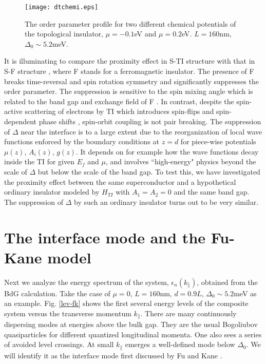 \documentclass[11pt]{report}
\begin{document}
\begin{figure}
\texttt{[image: dtchemi.eps]}
\caption{The order parameter profile for two different chemical potentials of
the topological insulator, $\mu=-0.1$eV and $\mu=0.2$eV. $L=160$nm,  
$\Delta_0\sim 5.2$meV. }\label{delta-chem}
\end{figure}

It is illuminating to compare the proximity effect in S-TI
structure with that in S-F structure \cite{toku}, where F stands for 
a ferromagnetic insulator. 
The presence of F breaks time-reversal and spin rotation symmetry and 
significantly suppresses the order parameter. The suppression is
sensitive to the spin mixing angle which is related to the band gap
and exchange field of F \cite{toku}.
In contrast, despite the spin-active scattering of electrons 
by TI which introduces spin-flips and spin-dependent phase shifts \cite{zhao}, 
spin-orbit coupling is not pair breaking.
%
The suppression of $\Delta$ near the interface is to a large extent 
due to the reorganization of local wave functions enforced by the boundary conditions 
at $z=d$ for piece-wise potentials $\mu(z)$, $A_i(z)$, $g(z)$. 
It depends on for example how the wave functions decay inside the TI
for given $E_f$ and $\mu$, and involves ``high-energy" physics beyond the
scale of $\Delta$ but below the scale of the band gap. 
%
To test this, we have investigated the proximity effect between the same
superconductor and
a hypothetical ordinary insulator modeled by $H_{TI}$ with $A_1=A_2=0$
and the same band gap. The suppression of $\Delta$ by such an 
ordinary insulator turns out to be very similar. 

\section{The interface mode and the Fu-Kane model}

Next we analyze the energy spectrum of the system, $\epsilon_n(k_\parallel)$,
obtained from the BdG calculation. 
Take the case of $\mu=0$, $L=160$nm, $d=0.9L$, $\Delta_0\sim 5.2$meV as an example.
Fig. \ref{lev-fk} shows the first several energy levels of the composite
system versus the transverse momentum $k_\parallel$. There are many continuously
dispersing modes at energies above the bulk gap. They are the usual Bogoliubov
quasiparticles for different quantized longitudinal momenta.
One also sees a series of avoided level crossings.
At small $k_\parallel$ emerges a well-defined mode below $\Delta_0$. We will 
identify it as the interface mode first discussed by Fu and Kane \cite{f-k}.
\end{document}

